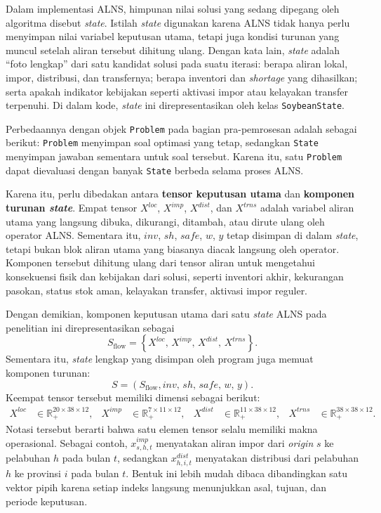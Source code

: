 \documentclass{file/TA-ITS}
\theoremstyle{definition}
\theoremstyle{definition}
\theoremstyle{plain}
\begin{document}
Dalam implementasi ALNS, himpunan nilai solusi yang sedang dipegang oleh algoritma disebut \textit{state}. Istilah \textit{state} digunakan karena ALNS tidak hanya perlu menyimpan nilai variabel keputusan utama, tetapi juga kondisi turunan yang muncul setelah aliran tersebut dihitung ulang. Dengan kata lain, \textit{state} adalah ``foto lengkap'' dari satu kandidat solusi pada suatu iterasi: berapa aliran lokal, impor, distribusi, dan transfernya; berapa inventori dan \textit{shortage} yang dihasilkan; serta apakah indikator kebijakan seperti aktivasi impor atau kelayakan transfer terpenuhi. Di dalam kode, \textit{state} ini direpresentasikan oleh kelas \texttt{SoybeanState}.

Perbedaannya dengan objek \texttt{Problem} pada bagian pra-pemrosesan adalah sebagai berikut: \texttt{Problem} menyimpan soal optimasi yang tetap, sedangkan \texttt{State} menyimpan jawaban sementara untuk soal tersebut. Karena itu, satu \texttt{Problem} dapat dievaluasi dengan banyak \texttt{State} berbeda selama proses ALNS.

Karena itu, perlu dibedakan antara \textbf{tensor keputusan utama} dan \textbf{komponen turunan \textit{state}}. Empat tensor \(X^{loc}\), \(X^{imp}\), \(X^{dist}\), dan \(X^{trns}\) adalah variabel aliran utama yang langsung dibuka, dikurangi, ditambah, atau dirute ulang oleh operator ALNS. Sementara itu, \(inv\), \(sh\), \(safe\), \(w\), \(y\) tetap disimpan di dalam \textit{state}, tetapi bukan blok aliran utama yang biasanya diacak langsung oleh operator. Komponen tersebut dihitung ulang dari tensor aliran untuk mengetahui konsekuensi fisik dan kebijakan dari solusi, seperti inventori akhir, kekurangan pasokan, status stok aman, kelayakan transfer, aktivasi impor reguler.

Dengan demikian, komponen keputusan utama dari satu \textit{state} ALNS pada penelitian ini direpresentasikan sebagai
\[
S_{\text{flow}} =
\left\{
X^{loc},\,
X^{imp},\,
X^{dist},\,
X^{trns}
\right\}.
\]
Sementara itu, \textit{state} lengkap yang disimpan oleh program juga memuat komponen turunan:
\[
S =
\left(
S_{\text{flow}},
inv,\,
sh,\,
safe,\,
w,\,
y
\right).
\]
Keempat tensor tersebut memiliki dimensi sebagai berikut:
\[
\begin{aligned}
X^{loc}  &\in \mathbb{R}_{+}^{20 \times 38 \times 12},
&
X^{imp}  &\in \mathbb{R}_{+}^{7 \times 11 \times 12},
&
X^{dist} &\in \mathbb{R}_{+}^{11 \times 38 \times 12},
&
X^{trns} &\in \mathbb{R}_{+}^{38 \times 38 \times 12}.
\end{aligned}
\]
Notasi tersebut berarti bahwa satu elemen tensor selalu memiliki makna operasional. Sebagai contoh, \(x^{imp}_{s,h,t}\) menyatakan aliran impor dari \textit{origin} \(s\) ke pelabuhan \(h\) pada bulan \(t\), sedangkan \(x^{dist}_{h,i,t}\) menyatakan distribusi dari pelabuhan \(h\) ke provinsi \(i\) pada bulan \(t\). Bentuk ini lebih mudah dibaca dibandingkan satu vektor pipih karena setiap indeks langsung menunjukkan asal, tujuan, dan periode keputusan.
\end{document}
